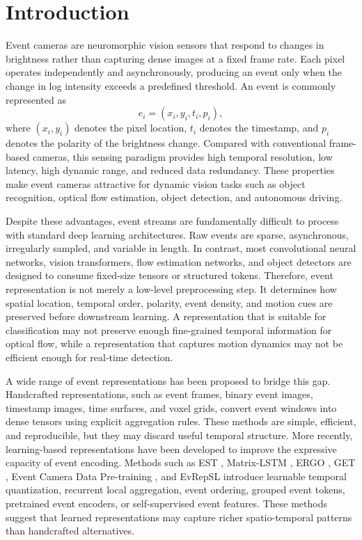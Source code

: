 \documentclass[letterpaper]{article}
\begin{document}
\section{Introduction}
Event cameras are neuromorphic vision sensors that respond to changes in brightness rather than capturing dense images at a fixed frame rate. Each pixel operates independently and asynchronously, producing an event only when the change in log intensity exceeds a predefined threshold. An event is commonly represented as
\[
e_i=(x_i,y_i,t_i,p_i),
\]
where $(x_i,y_i)$ denotes the pixel location, $t_i$ denotes the timestamp, and $p_i$ denotes the polarity of the brightness change. Compared with conventional frame-based cameras, this sensing paradigm provides high temporal resolution, low latency, high dynamic range, and reduced data redundancy. These properties make event cameras attractive for dynamic vision tasks such as object recognition, optical flow estimation, object detection, and autonomous driving.

Despite these advantages, event streams are fundamentally difficult to process with standard deep learning architectures. Raw events are sparse, asynchronous, irregularly sampled, and variable in length. In contrast, most convolutional neural networks, vision transformers, flow estimation networks, and object detectors are designed to consume fixed-size tensors or structured tokens. Therefore, event representation is not merely a low-level preprocessing step. It determines how spatial location, temporal order, polarity, event density, and motion cues are preserved before downstream learning. A representation that is suitable for classification may not preserve enough fine-grained temporal information for optical flow, while a representation that captures motion dynamics may not be efficient enough for real-time detection.

A wide range of event representations has been proposed to bridge this gap. Handcrafted representations, such as event frames, binary event images, timestamp images, time surfaces, and voxel grids, convert event windows into dense tensors using explicit aggregation rules. These methods are simple, efficient, and reproducible, but they may discard useful temporal structure. More recently, learning-based representations have been developed to improve the expressive capacity of event encoding. Methods such as EST \cite{gehrig2019est}, Matrix-LSTM \cite{cannici2020matrixlstm}, ERGO \cite{zubizarreta2023ergo}, GET \cite{peng2023get}, Event Camera Data Pre-training \cite{yang2023eventpretraining}, and EvRepSL \cite{qu2024evrepsl} introduce learnable temporal quantization, recurrent local aggregation, event ordering, grouped event tokens, pretrained event encoders, or self-supervised event features. These methods suggest that learned representations may capture richer spatio-temporal patterns than handcrafted alternatives.
\end{document}
